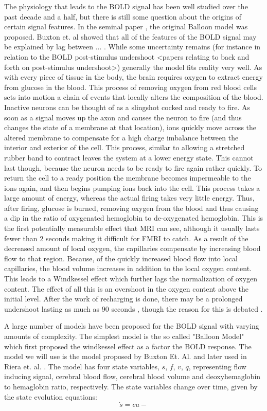 \documentclass{article}
\begin{document}
The physiology that leads to the BOLD signal has been well studied over the 
past decade and a half, but there is still some question about the origins
of certain signal features. In the seminal paper \cite{Buxton1999}, the original
Balloon model was proposed. Buxton et. al showed that all of the features
of the BOLD signal may be explained by lag between ... . While some uncertainty remains (for instance in
relation to the BOLD post-stimulus undershoot <papers relating to back and
forth on post-stimulus undershoot>) generally the model fits reality very 
well. As with every piece of tissue in the body, the brain requires oxygen
to extract energy from glucose in the blood. This process of removing oxygen
from red blood cells sets into motion a chain of events that locally 
alters the composition of the blood. Inactive neurons can be thought of
as a slingshot cocked and ready to fire. As soon as a signal moves up
the axon and causes the neuron to fire (and thus changes the state
of a membrane at that location), ions quickly move across the altered
membrane to compensate for a high charge imbalance between the interior
and exterior of the cell. This process, similar to allowing a stretched
rubber band to contract leaves the system at a lower energy state. This cannot
last though, because the neuron needs to be ready to fire again rather quickly.
To return the cell to a ready position the membrane becomes impermeable
to the ions again, and then begins pumping ions back into the cell. This
process takes a large amount of energy, whereas the actual firing takes
very little energy. Thus, after firing, glucose is burned, removing oxygen
from the blood and thus causing a dip in the ratio of oxygenated hemoglobin to 
de-oxygenated hemoglobin. This is the first potentially measurable effect
that MRI can see, although it usually lasts fewer than 2 seconds making it
difficult for FMRI to catch. As a result of the decreased amount of local oxygen,
the capillaries compensate by increasing blood flow to that region. Because,
of the quickly increased blood flow into local capillaries, the blood
volume increases in addition to the local oxygen content. This leads to a Windkessel
effect which further lags the normalization of oxygen content. The effect of
all this is an overshoot in the oxygen content above the initial level. After
the work of recharging is done, there may be a prolonged undershoot lasting
as much as 90 seconds \cite{spatial_undershoot}, though the reason for this
is debated \cite{origin_poststim}. 

A large number of models have been proposed for the BOLD signal with varying
amounts of complexity. The simplest model is the so called "Balloon Model"
which first proposed the windkessel effect as a factor the BOLD response.
The model we will use is the model proposed by Buxton Et. Al. and later used
in Riera et. al. \cite{Riera}. The model has four state variables, $s$, $f$,
$v$, $q$, representing flow inducing signal, cerebral blood flow, cerebral
blood volume and deoxyhemaglobin to hemaglobin ratio, respectively. The 
state variables change over time, given by the state evolution equations:
\begin{equation}
\dot{s} = \epsilon u -  
\end{equation}
\end{document}

